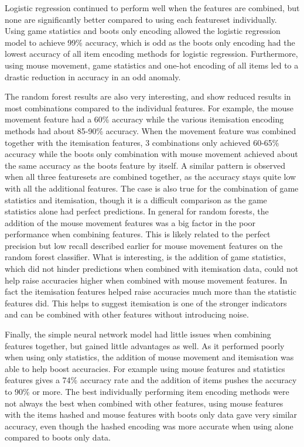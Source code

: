 \documentclass[Report.tex]{subfiles}
\begin{document}
Logistic regression continued to perform well when the features are combined, but none are significantly better compared to using each featureset individually. Using game statistics and boots only encoding allowed the logistic regression model to achieve 99\% accuracy, which is odd as the boots only encoding had the lowest accuracy of all item encoding methods for logistic regression. Furthermore, using mouse movement, game statistics and one-hot encoding of all items led to a drastic reduction in accuracy in an odd anomaly.  

The random forest results are also very interesting, and show reduced results in most combinations compared to the individual features. For example, the mouse movement feature had a 60\% accuracy while the various itemisation encoding methods had about 85-90\% accuracy. When the movement feature was combined together with the itemisation features, 3 combinations only achieved 60-65\% accuracy while the boots only combination with mouse movement achieved about the same accuracy as the boots feature by itself. A similar pattern is observed when all three featuresets are combined together, as the accuracy stays quite low with all the additional features. The case is also true for the combination of game statistics and itemisation, though it is a difficult comparison as the game statistics alone had perfect predictions. In general for random forests, the addition of the mouse movement features was a big factor in the poor performance when combining features. This is likely related to the perfect precision but low recall described earlier for mouse movement features on the random forest classifier. What is interesting, is the addition of game statistics, which did not hinder predictions when combined with itemisation data, could not help raise accuracies higher when combined with mouse movement features. In fact the itemisation features helped raise accuracies much more than the statistic features did. This helps to suggest itemisation is one of the stronger indicators and can be combined with other features without introducing noise. %

Finally, the simple neural network model had little issues when combining features together, but gained little advantages as well. As it performed poorly when using only statistics, the addition of mouse movement and itemisation was able to help boost accuracies. For example using mouse features and statistics features gives a 74\% accuracy rate and the addition of items pushes the accuracy to 90\% or more. The best individually performing item encoding methods were not always the best when combined with other features, using mouse features with the items hashed and mouse features with boots only data gave very similar accuracy, even though the hashed encoding was more accurate when using alone compared to boots only data.
\end{document}
